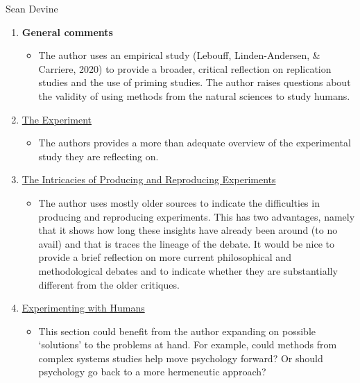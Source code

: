 \documentclass[twocolumn, serif, review, authordate]{jote-article}
\begin{document}
\noindent \begin{paracol}{2}
\begin{reviewend}{Sean Devine}
    \begin{enumerate}[label=\textbf{\arabic*}), start=0]
    \item \textbf{General comments}
        \begin{itemize}
            \item The author uses an empirical study (Lebouff, Linden-Andersen, \& Carriere, 2020) to provide a broader, critical reflection on replication studies and the use of priming studies. The author raises questions about the validity of using methods from the natural sciences to study humans.
        \end{itemize}

    \item \hyperref[sec:experiment]{The Experiment}
        \begin{itemize}
            \item The authors provides a more than adequate overview of the experimental study they are reflecting on.  
        \end{itemize}

    \item \hyperref[sec:intricacies]{The Intricacies of Producing and Reproducing Experiments}
        \begin{itemize}
            \item The author uses mostly older sources to indicate the difficulties in producing and reproducing experiments. This has two advantages, namely that it shows how long these insights have already been around (to no avail) and that is traces the lineage of the debate. It would be nice to provide a brief reflection on more current philosophical and methodological debates and to indicate whether they are substantially different from the older critiques.
        \end{itemize}
        
    \item \hyperref[sec:humans]{Experimenting with Humans}
        \begin{itemize}
            \item This section could benefit from the author expanding on possible ‘solutions’ to the problems at hand. For example, could methods from complex systems studies help move psychology forward? Or should psychology go back to a more hermeneutic approach?
        \end{itemize}
        

\end{enumerate}
\end{reviewend}
\end{paracol}
\end{document}
